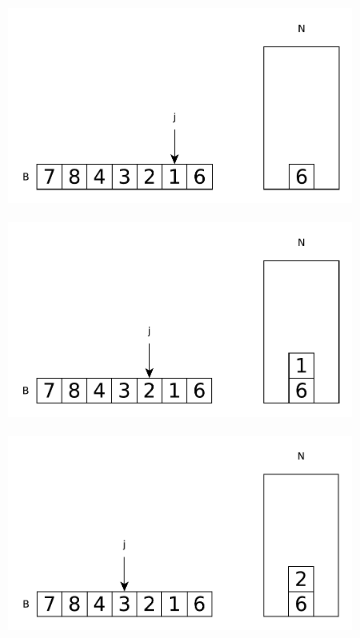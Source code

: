  \begin{figure}
	\vspace*{-0.5in}
	\centering
	\begin{subfigure}[t]{0.49\textwidth}
		\begin{framed}
			\includegraphics[width=1\linewidth]{sources/next_greater_element/images/stack1}
		\end{framed}
		\caption{}
		\label{fig:next_greater:variation1:stack1}
	 \end{subfigure}
	\hfill
	\begin{subfigure}[t]{0.49\textwidth}
		\begin{framed}
			\includegraphics[width=1\linewidth]{sources/next_greater_element/images/stack2}
		\end{framed}
		\caption{}
		\label{fig:next_greater:variation1:stack1}
	 \end{subfigure}
	 \hfill
	 \begin{subfigure}[t]{0.49\textwidth}
		\begin{framed}
			\includegraphics[width=1\linewidth]{sources/next_greater_element/images/stack3}

\end{framed}
\end{subfigure}
\end{figure}
